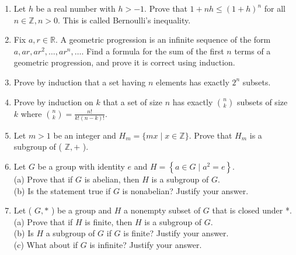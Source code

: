 \newpage

\begin{enumerate}
  \item Let $h$ be a real number with $h>-1$. Prove that $1+n h \leq(1+h)^{n}$ for all $n \in \mathbb{Z}, n>0$. This is called Bernoulli's inequality.
  \item Fix $a, r \in \mathbb{R}$. A geometric progression is an infinite sequence of the form $a, a r, a r^{2}, \ldots, a r^{n}, \ldots$. Find a formula for the sum of the first $n$ terms of a geometric progression, and prove it is correct using induction.
  \item Prove by induction that a set having $n$ elements has exactly $2^{n}$ subsets.
  \item Prove by induction on $k$ that a set of size $n$ has exactly $\binom{n}{k}$ subsets of size $k$ where $\binom{n}{k}= \frac{n!}{k!(n-k)!}$.
  \item Let $m>1$ be an integer and $H_{m}=\{m x \mid x \in \mathbb{Z}\}$. Prove that $H_{m}$ is a subgroup of ( $\mathbb{Z},+$ ).
  \item Let $G$ be a group with identity $e$ and $H=\left\{a \in G \mid a^{2}=e\right\}$.\\
(a) Prove that if $G$ is abelian, then $H$ is a subgroup of $G$.\\
(b) Is the statement true if $G$ is nonabelian? Justify your answer.
  \item Let ( $G, *$ ) be a group and $H$ a nonempty subset of $G$ that is closed under *.\\
(a) Prove that if $H$ is finite, then $H$ is a subgroup of $G$.\\
(b) Is $H$ a subgroup of $G$ if $G$ is finite? Justify your answer.\\
(c) What about if $G$ is infinite? Justify your answer.
\end{enumerate}